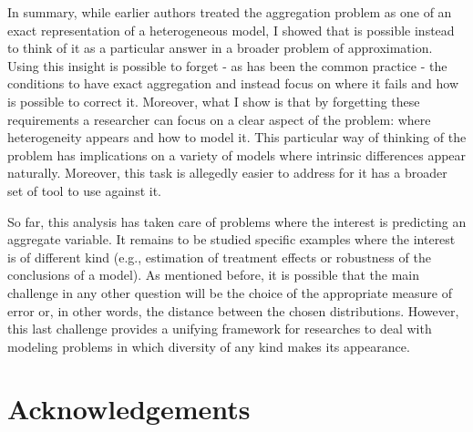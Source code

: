 \documentclass[english, a4paper, 12pt]{article}
\begin{document}
In summary, while earlier authors treated the aggregation problem as one of an exact representation of a heterogeneous model, I showed that is possible instead to think of it as a particular answer in a broader problem of approximation. Using this insight is possible to forget - as has been the common practice - the conditions to have exact aggregation and instead focus on where it fails and how is possible to correct it. Moreover, what I show is that by forgetting these requirements a researcher can focus on a clear aspect of the problem: where heterogeneity appears and how to model it. This particular way of thinking of the problem has implications on a variety of models where intrinsic differences appear naturally. Moreover, this task is allegedly easier to address for it has a broader set of tool to use against it. 

So far, this analysis has taken care of problems where the interest is predicting an aggregate variable. It remains to be studied specific examples where the interest is of different kind (e.g., estimation of treatment effects or robustness of the conclusions of a model). As mentioned before, it is possible that the main challenge in any other question will be the choice of the appropriate measure of error or, in other words, the distance between the chosen distributions. However, this last challenge provides a unifying framework for researches to deal with modeling problems in which diversity of any kind makes its appearance.

\newpage
\section{Acknowledgements}





\end{document}
